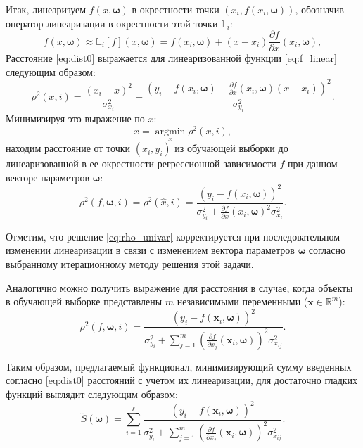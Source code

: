 \documentclass[tikz,10pt,a4paper]{article}
\newcommand{\bomega}{\boldsymbol{\omega}}
\begin{document}
Итак, линеаризуем $f(x, \bomega)$ в окрестности точки $(x_i, f(x_i, \bomega))$,
обозначив оператор линеаризации в окрестности этой точки $\mathbb{L}_i$:
\begin{equation}
  f(x, \bomega) \approx \mathbb{L}_{i}[f](x, \bomega) = f(x_i, \bomega) + (x - x_i) \frac{\partial f}{\partial x}(x_i, \bomega),
  \label{eq:f_linear}
\end{equation}
Расстояние \eqref{eq:dist0} выражается для линеаризованной функции
\eqref{eq:f_linear} следующим образом:
\begin{equation}
  \rho^2(x, i) = \frac{(x_i - x)^2}{\sigma_{x_i}^2} + \frac{(y_i - f(x_i, \bomega) - \frac{\partial f}{\partial x}(x_i, \bomega) (x - x_i))^2}{\sigma_{y_i}^2}.
  \label{eq:dist_linear}
\end{equation}
Минимизируя это выражение по $x$:
\[
  \hat{x} = \mathop{\arg \min}\limits_x \rho^2(x, i),
\]
находим расстояние от точки $(x_i, y_i)$ из обучающей выборки до
линеаризованной в ее окрестности регрессионной зависимости $f$ при
данном векторе параметров $\bomega$:
\begin{equation}
  \rho^2(f, \bomega, i) = \rho^2(\hat{x}, i) = \frac{(y_i - f(x_i, \bomega))^2}{\sigma^2_{y_i} + \frac{\partial f}{\partial x}(x_i, \bomega)^2 \sigma^2_{x_i}}.
  \label{eq:rho_univar}
\end{equation}

Отметим, что решение \eqref{eq:rho_univar} корректируется при
последовательном изменении линеаризации в связи с изменением вектора
параметров $\bomega$ согласно выбранному итерационному методу решения
этой задачи.

Аналогично можно получить выражение для расстояния в случае, когда объекты в обучающей выборке
представлены $m$ независимыми переменными ($\mathbf{x} \in \mathbb{R}^m$):
\[
  \rho^2(f, \bomega, i) = \frac{(y_i - f(\mathbf{x}_i, \bomega))^2}{\sigma_{y_i}^2 + \sum_{j = 1}^m (\frac{\partial f}{\partial x_j}(\mathbf{x}_i, \bomega))^2 \sigma^2_{x_{ij}}}.
\]

Таким образом, предлагаемый функционал, минимизирующий сумму введенных
согласно \eqref{eq:dist0} расстояний с учетом их линеаризации,
для достаточно гладких функций выглядит следующим образом:
\begin{equation}
  \breve{S}(\bomega) = \sum_{i = 1}^\ell \frac{(y_i - f(\mathbf{x}_i, \bomega))^2}{\sigma_{y_i}^2 + \sum_{j = 1}^m (\frac{\partial f}{\partial x_j}(\mathbf{x}_i, \bomega))^2 \sigma^2_{x_{ij}}}.
  \label{eq:s}
\end{equation}
\end{document}

